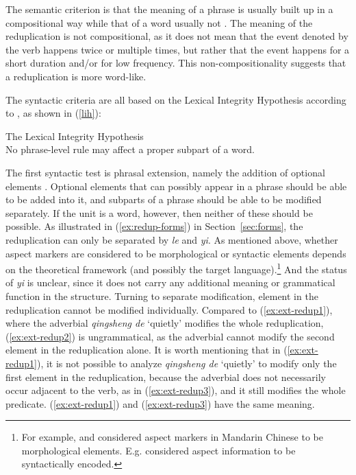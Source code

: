The semantic criterion is that the meaning of a phrase is usually built up in a compositional way while that of a word usually not \citetext{\citealp[140]{Duanmu1998}; \citealp[275]{Schaefer2009}}. 
The meaning of the reduplication is not compositional, as it does not mean that the event denoted by the verb happens twice or multiple times, but rather that the event happens for a short duration and/or for low frequency.
This non-compositionality suggests that a reduplication is more word-like.


The syntactic criteria are all based on the Lexical Integrity Hypothesis according to \citet[60]{Huang1984}, as shown in (\ref{lih}):

\ea\label{lih}The Lexical Integrity Hypothesis\\
No phrase-level rule may affect a proper subpart of a word.
\z

The first syntactic test is phrasal extension, namely the addition of optional elements \citetext{\citealp[150]{Duanmu1998}; \citealp[280]{Schaefer2009}}. 
Optional elements that can possibly appear in a phrase should be able to be added into it,
and subparts of a phrase should be able to be modified separately. 
If the unit is a word, however, then neither of these should  be possible.
As illustrated in (\ref{ex:redup-forms}) in Section~\ref{sec:forms}, the reduplication can only be separated by \textit{le} and \textit{yi}. 
As mentioned above, whether aspect markers are considered to be morphological or syntactic elements depends on the theoretical framework (and possibly the target language).\footnote{For example, \citet{Huangetal2009} and \citet{MuellerLipenkova2013} considered aspect markers in Mandarin Chinese to be morphological elements. E.g. \citet{Travis2000, Arcodiaetal2014, BascianoMelloni2017} considered aspect information to be syntactically encoded.} 
And the status of \textit{yi} is unclear, since it does not carry any additional meaning or grammatical function in the structure. %
Turning to separate modification,  element in the reduplication cannot be modified individually. 
Compared to (\ref{ex:ext-redup1}), where the adverbial \textit{qingsheng de} `quietly' modifies the whole reduplication, (\ref{ex:ext-redup2}) is ungrammatical, 
as the adverbial cannot modify the second element in the reduplication alone.
It is worth mentioning that in (\ref{ex:ext-redup1}), it is not possible to analyze \textit{qingsheng de} `quietly' to modify only the first element in the reduplication, 
because the adverbial does not necessarily occur adjacent to the verb, as in (\ref{ex:ext-redup3}), 
and it still modifies the whole predicate.
(\ref{ex:ext-redup1}) and  (\ref{ex:ext-redup3}) have the same meaning.

